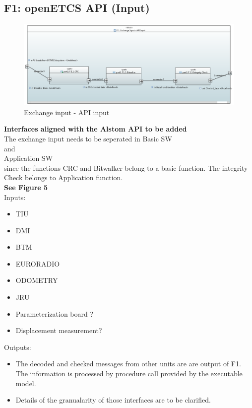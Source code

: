 \documentclass{template/openetcs_report}
\begin{document}
\subsection{F1: openETCS API (Input)}
\begin{figure}[hbtp]
\centering
\includegraphics [scale=0.5] {images/F1_Exchange_input}
\caption{Exchange input - API input}
\end{figure}

\textbf{Interfaces aligned with the Alstom API to be added}\\
The exchange input needs to be seperated in 
Basic SW\\
and\\
Application SW \\
since the functions CRC and Bitwalker belong to a basic function. The integrity Check belongs to Application function.\\

\textbf{See Figure 5}\\
 
Inputs:\\
\begin{itemize}
\item TIU
\item DMI
\item BTM
\item EURORADIO
\item ODOMETRY
\item JRU
\item Parameterization board ?
\item Displacement measurement?
\end{itemize}

Outputs:\\
\begin{itemize}
\item The decoded and checked messages from other units are  are output of F1. The information is processed by procedure call provided by the executable model.
\item Details of the granualarity of those interfaces are to be clarified.
\end{itemize}
\end{document}
